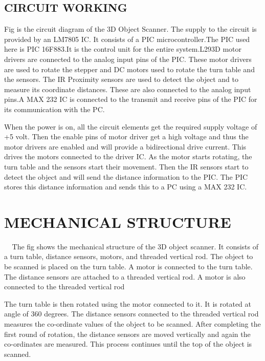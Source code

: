 \documentclass[12pt,a4paper,oneside]{report}
\begin{document}
\begin{onehalfspacing}
\section{CIRCUIT WORKING}
\par
\hspace{.7cm}
Fig   is the circuit diagram of the 3D Object Scanner. The supply to the circuit is provided by an LM7805 IC. It consists of a PIC microcontroller.The PIC used here is PIC 16F883.It is the control unit for the entire system.L293D motor drivers are connected to the analog input pins of the PIC. These motor drivers are used to rotate the stepper and DC motors used to rotate the turn table and the sensors. The IR Proximity sensors are used to detect the object and to measure its coordinate distances. These are also connected to the analog input pins.A MAX 232 IC is connected to the transmit and receive pins of the PIC for its communication with the PC.
\par
When the power is on, all the circuit elements get the required supply voltage of +5 volt. Then the enable pins of motor driver get a high voltage and thus the motor drivers are enabled and will provide a bidirectional drive current. This drives the motors connected to the driver IC. As the motor starts rotating, the turn table and the sensors start their movement. Then the IR sensors start to detect the object and will send the distance information to the PIC. The PIC stores this distance information and sends this to a PC using a MAX 232 IC. 

\chapter{\uppercase{MECHANICAL STRUCTURE}}
{$\;\;\;\;$}The fig   shows the mechanical structure of the 3D object scanner. It consists of a turn table, distance sensors, motors, and threaded vertical rod. The object to be scanned is placed on the turn table. A motor is connected to the turn table. The distance sensors are attached to a threaded vertical rod. A motor is also connected to the threaded vertical rod
\par
The turn table is then rotated using the motor connected to it. It is rotated at angle of 360 degrees. The distance sensors connected to the threaded vertical rod measures the co-ordinate values of the object to be scanned. After completing the first round of rotation, the distance sensors are moved vertically and again the co-ordinates are measured. This process continues until the top of the object is scanned. 


\end{onehalfspacing}
\end{document}
